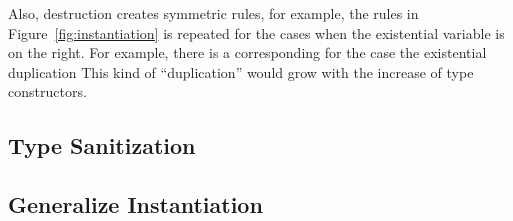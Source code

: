 Also, destruction creates symmetric rules, for example, the rules in
Figure~\ref{fig:instantiation} is repeated for the cases when the existential
variable is on the right. For example, there is a corresponding 
for the case the existential duplication This kind of ``duplication'' would grow
with the increase of type constructors.

\subsection{Type Sanitization}

\subsection{Generalize Instantiation}

